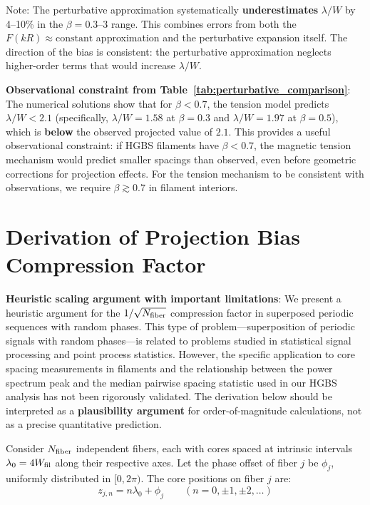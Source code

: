 \documentclass[11pt,a4paper]{article}
\begin{document}
\vspace{0.5em}
{\small Note: The perturbative approximation systematically \textbf{underestimates} $\lambda/W$ by 4--10\% in the $\beta = 0.3$--$3$ range. This combines errors from both the $F(kR) \approx \text{constant}$ approximation and the perturbative expansion itself. The direction of the bias is consistent: the perturbative approximation neglects higher-order terms that would increase $\lambda/W$.}

\textbf{Observational constraint from Table~\ref{tab:perturbative_comparison}}: The numerical solutions show that for $\beta < 0.7$, the tension model predicts $\lambda/W < 2.1$ (specifically, $\lambda/W = 1.58$ at $\beta = 0.3$ and $\lambda/W = 1.97$ at $\beta = 0.5$), which is \textbf{below} the observed projected value of $2.1$. This provides a useful observational constraint: if HGBS filaments have $\beta < 0.7$, the magnetic tension mechanism would predict smaller spacings than observed, even before geometric corrections for projection effects. For the tension mechanism to be consistent with observations, we require $\beta \gtrsim 0.7$ in filament interiors.

\section{Derivation of Projection Bias Compression Factor}
\label{app:projection_bias}

\textbf{Heuristic scaling argument with important limitations}: We present a heuristic argument for the $1/\sqrt{N_{\rm fiber}}$ compression factor in superposed periodic sequences with random phases. This type of problem—superposition of periodic signals with random phases—is related to problems studied in statistical signal processing and point process statistics. However, the specific application to core spacing measurements in filaments and the relationship between the power spectrum peak and the median pairwise spacing statistic used in our HGBS analysis has not been rigorously validated. The derivation below should be interpreted as a \textbf{plausibility argument} for order-of-magnitude calculations, not as a precise quantitative prediction.

Consider $N_{\rm fiber}$ independent fibers, each with cores spaced at intrinsic intervals $\lambda_0 = 4W_{\rm fil}$ along their respective axes. Let the phase offset of fiber $j$ be $\phi_j$, uniformly distributed in $[0, 2\pi)$. The core positions on fiber $j$ are:
\begin{equation}
z_{j,n} = n\lambda_0 + \phi_j \qquad (n = 0, \pm 1, \pm 2, \ldots)
\end{equation}
\end{document}
